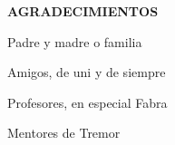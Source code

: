 \begin{center}
{\LARGE \bfseries AGRADECIMIENTOS}
\vspace{2.5cm}
\end{center}

Padre y madre o familia

Amigos, de uni y de siempre

Profesores, en especial Fabra

Mentores de Tremor

